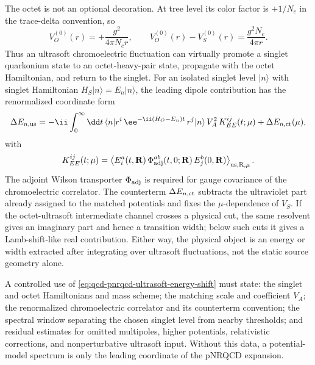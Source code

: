 \begin{controlledapproximation}
The octet is not an optional decoration.  At tree level its color factor is
\(+1/N_c\) in the trace-delta convention, so
\begin{equation}
  V_O^{(0)}(r)=+\frac{g^2}{4\pi N_c r},
  \qquad
  V_O^{(0)}(r)-V_S^{(0)}(r)
  =
  \frac{g^2N_c}{4\pi r}.
  \label{eq:qcd-pnrqcd-tree-octet-gap}
\end{equation}
Thus an ultrasoft chromoelectric fluctuation can virtually promote a singlet
quarkonium state to an octet-heavy-pair state, propagate with the octet
Hamiltonian, and return to the singlet.  For an isolated singlet level
\(|n\rangle\) with singlet Hamiltonian \(H_S|n\rangle=E_n|n\rangle\), the
leading dipole contribution has the renormalized coordinate form
\begin{equation}
  \Delta E_{n,{\rm us}}
  =
  -\ii
  \int_0^\infty \dd t\,
  \langle n|
    r^i\,
    \ee^{-\ii(H_O-E_n)t}\,
    r^j
  |n\rangle\,
  V_A^2\,
  K_{EE}^{ij}(t;\mu)
  +\Delta E_{n,{\rm ct}}(\mu),
  \label{eq:qcd-pnrqcd-ultrasoft-energy-shift}
\end{equation}
with
\[
  K_{EE}^{ij}(t;\mu)
  =
  \left\langle
  E_i^a(t,\mathbf R)\,
  \Phi_{\rm adj}^{ab}(t,0;\mathbf R)\,
  E_j^b(0,\mathbf R)
  \right\rangle_{\rm us,R,\mu}.
\]
The adjoint Wilson transporter \(\Phi_{\rm adj}\) is required for gauge
covariance of the chromoelectric correlator.  The counterterm
\(\Delta E_{n,{\rm ct}}\) subtracts the ultraviolet part already assigned to
the matched potentials and fixes the \(\mu\)-dependence of \(V_S\).  If the
octet-ultrasoft intermediate channel crosses a physical cut, the same
resolvent gives an imaginary part and hence a transition width; below such
cuts it gives a Lamb-shift-like real contribution.  Either way, the physical
object is an energy or width extracted after integrating over ultrasoft
fluctuations, not the static source geometry alone.

A controlled use of \eqref{eq:qcd-pnrqcd-ultrasoft-energy-shift} must state:
the singlet and octet Hamiltonians and mass scheme; the matching scale and
coefficient \(V_A\); the renormalized chromoelectric correlator and its
counterterm convention; the spectral window separating the chosen singlet
level from nearby thresholds; and residual estimates for omitted multipoles,
higher potentials, relativistic corrections, and nonperturbative ultrasoft
input.  Without this data, a potential-model spectrum is only the leading
coordinate of the pNRQCD expansion.
\end{controlledapproximation}


